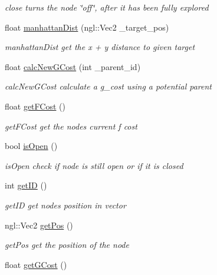 \begin{DoxyCompactItemize}
\begin{DoxyCompactList}\small\item\em close turns the node \char`\"{}off\char`\"{}, after it has been fully explored \end{DoxyCompactList}\item 
float \hyperlink{class_node_af95509316f58304a109ec6219852e9a6}{manhattan\+Dist} (ngl\+::\+Vec2 \+\_\+target\+\_\+pos)
\begin{DoxyCompactList}\small\item\em manhattan\+Dist get the x + y distance to given target \end{DoxyCompactList}\item 
float \hyperlink{class_node_a6e381c2bfd15c2dc9ed143365069d5c5}{calc\+New\+G\+Cost} (int \+\_\+parent\+\_\+id)
\begin{DoxyCompactList}\small\item\em calc\+New\+G\+Cost calculate a g\+\_\+cost using a potential parent \end{DoxyCompactList}\item 
float \hyperlink{class_node_a035520f62e2915be93c7856a77fdf6de}{get\+F\+Cost} ()
\begin{DoxyCompactList}\small\item\em get\+F\+Cost get the node\textquotesingle{}s current f cost \end{DoxyCompactList}\item 
bool \hyperlink{class_node_a9b974f25fc2cd0faf1e4c2908e5cda81}{is\+Open} ()
\begin{DoxyCompactList}\small\item\em is\+Open check if node is still open or if it is closed \end{DoxyCompactList}\item 
int \hyperlink{class_node_a8dd9a1d6ac9638fd1168283ad47e5127}{get\+I\+D} ()
\begin{DoxyCompactList}\small\item\em get\+I\+D get node\textquotesingle{}s position in vector \end{DoxyCompactList}\item 
ngl\+::\+Vec2 \hyperlink{class_node_adafb39921bb5ec7f52dc2d4fd7488663}{get\+Pos} ()
\begin{DoxyCompactList}\small\item\em get\+Pos get the position of the node \end{DoxyCompactList}\item 
float \hyperlink{class_node_a2fb8eb3885cfa725ed0ea3a877b15e95}{get\+G\+Cost} ()

\end{DoxyCompactItemize}
